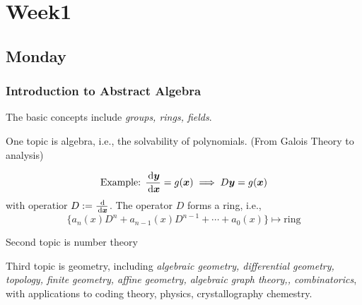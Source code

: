 
\chapter{Week1}

\section{Monday}

\subsection{Introduction to Abstract Algebra}
The basic concepts include \emph{groups, rings, fields}.

One topic is algebra, i.e., the solvability of polynomials. (From Galois Theory to analysis)

\[
\mbox{Example: }
\frac{\,\mathrm{d} \bm y}{\,\mathrm{d}\bm x} = g(\bm x)\implies D\bm y=g(\bm x)
\]
with operatior $D:=\frac{\,\mathrm{d}}{\,\mathrm{d} \bm x}$. The operator $D$ forms a ring, i.e.,
\[
\{a_n(x)D^n+a_{n-1}(x)D^{n-1}+\cdots+a_0(x)\}\mapsto\mbox{ring}
\]

Second topic is number theory

Third topic is geometry, including \textit{algebraic geometry, differential geometry, topology, finite geometry, affine geometry, algebraic graph theory,, combinatorics}, with applications to coding theory, physics, crystallography chemestry.

